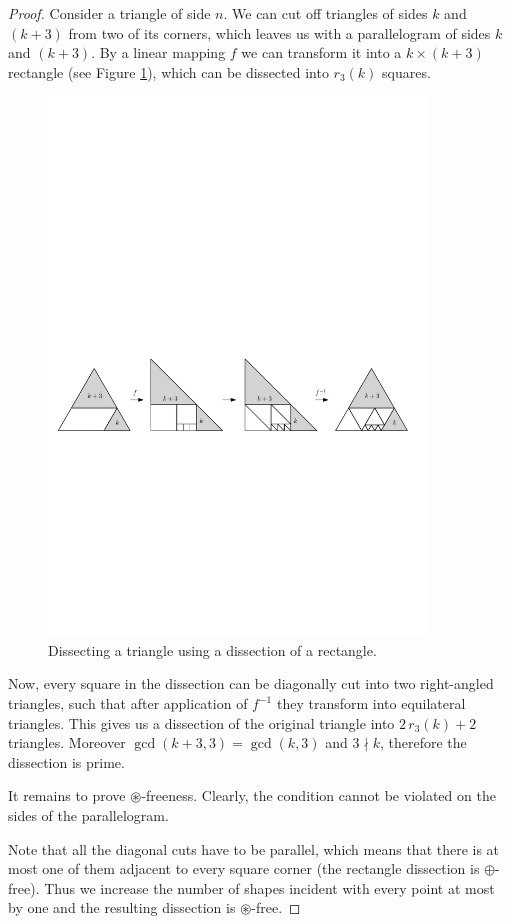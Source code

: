 \begin{proof}
Consider a triangle of side $n$. We can cut off triangles of sides $k$ and $(k+3)$ from two of its corners, which leaves us with a parallelogram of sides $k$ and $(k+3)$. By a linear mapping $f$ we can transform it into a $k\times (k+3)$ rectangle (see Figure \ref{fig:transf}), which can be dissected into $r_3(k)$ squares.

\begin{figure}[htb]
\centering
\includegraphics[width=0.9\textwidth]{img/transf.pdf}
\caption{Dissecting a triangle using a dissection of a rectangle.}
\label{fig:transf}
\end{figure}

Now, every square in the dissection can be diagonally cut into two right-angled triangles, such that after application of $f^{-1}$ they transform into equilateral triangles. This gives us a dissection of the original triangle into $2\,r_3(k)+2$ triangles. Moreover $\gcd(k+3,3) =\gcd (k,3)$ and $3 \nmid k$, therefore the dissection is prime.

It remains to prove $\circledast$-freeness. Clearly, the condition cannot be violated on the sides of the parallelogram.

Note that all the diagonal cuts have to be parallel, which means that there is at most one of them adjacent to every square corner (the rectangle dissection is $\oplus$-free). Thus we increase the number of shapes incident with every point at most by one and the resulting dissection is $\circledast$-free.
\end{proof}


